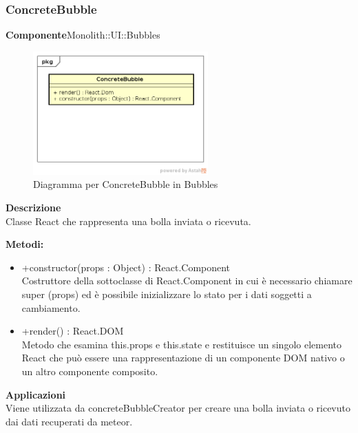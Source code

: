 \subsubsection{ConcreteBubble}
\textbf{Componente}Monolith::UI::Bubbles\\
   \FloatBarrier
   \begin{figure}[ht]
   \centering
   \includegraphics[width=0.6\textwidth]{img/single-ConcreteBubble}
   \caption{{Diagramma per ConcreteBubble in Bubbles}}
\end{figure}
\FloatBarrier
\textbf{Descrizione}\\
Classe React che rappresenta una bolla inviata o ricevuta.

\textbf{Metodi:} \begin{itemize}\item +constructor(props : Object) : React.Component \\Costruttore della sottoclasse di React.Component in cui è necessario chiamare super (props) ed è possibile inizializzare lo stato per i dati soggetti a cambiamento. 

\item +render() : React.DOM \\Metodo che esamina this.props e this.state e restituisce un singolo elemento React che può essere una rappresentazione di un componente DOM nativo o un altro componente composito.\end{itemize} 


\textbf{Applicazioni}\\
Viene utilizzata da concreteBubbleCreator per creare una bolla inviata o ricevuto dai dati recuperati da meteor. 


\clearpage

